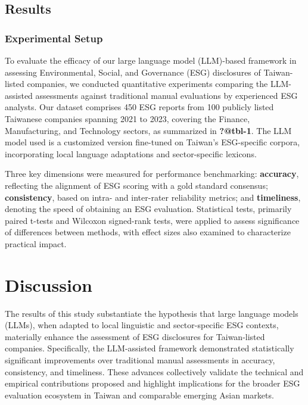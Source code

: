 \documentclass[
  12pt,
]{article}
\begin{document}
\subsection{Results}\label{results-1}

\subsubsection{Experimental Setup}\label{experimental-setup}

To evaluate the efficacy of our large language model (LLM)-based
framework in assessing Environmental, Social, and Governance (ESG)
disclosures of Taiwan-listed companies, we conducted quantitative
experiments comparing the LLM-assisted assessments against traditional
manual evaluations by experienced ESG analysts. Our dataset comprises
450 ESG reports from 100 publicly listed Taiwanese companies spanning
2021 to 2023, covering the Finance, Manufacturing, and Technology
sectors, as summarized in \textbf{?@tbl-1}. The LLM model used is a
customized version fine-tuned on Taiwan's ESG-specific corpora,
incorporating local language adaptations and sector-specific lexicons.

Three key dimensions were measured for performance benchmarking:
\textbf{accuracy}, reflecting the alignment of ESG scoring with a gold
standard consensus; \textbf{consistency}, based on intra- and
inter-rater reliability metrics; and \textbf{timeliness}, denoting the
speed of obtaining an ESG evaluation. Statistical tests, primarily
paired t-tests and Wilcoxon signed-rank tests, were applied to assess
significance of differences between methods, with effect sizes also
examined to characterize practical impact.

\section{Discussion}\label{discussion}

The results of this study substantiate the hypothesis that large
language models (LLMs), when adapted to local linguistic and
sector-specific ESG contexts, materially enhance the assessment of ESG
disclosures for Taiwan-listed companies. Specifically, the LLM-assisted
framework demonstrated statistically significant improvements over
traditional manual assessments in accuracy, consistency, and timeliness.
These advances collectively validate the technical and empirical
contributions proposed and highlight implications for the broader ESG
evaluation ecosystem in Taiwan and comparable emerging Asian markets.
\end{document}
